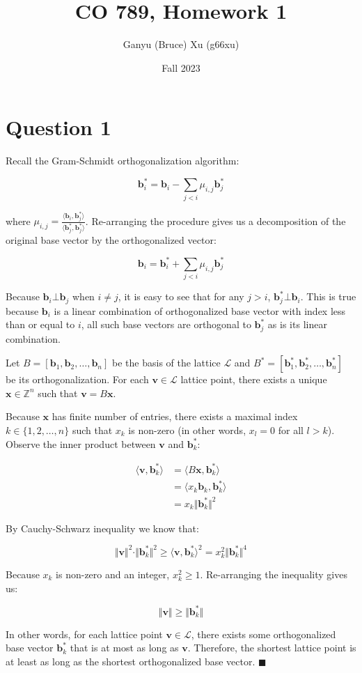 \documentclass{article}
\title{CO 789, Homework 1}
\author{Ganyu (Bruce) Xu (g66xu)}
\date{Fall 2023}
\newcommand{\norm}[1]{\Vert {#1} \Vert}
\begin{document}

\section*{Question 1}
Recall the Gram-Schmidt orthogonalization algorithm:

$$
\mathbf{b}_i^\ast = \mathbf{b}_i - \sum_{j<i} \mu_{i,j} \mathbf{b}_j^\ast
$$

where $\mu_{i, j} = \frac{\langle \mathbf{b}_i, \mathbf{b}_j^\ast \rangle}{\langle \mathbf{b}_j^\ast, \mathbf{b}_j^\ast\rangle}$. Re-arranging the procedure gives us a decomposition of the original base vector by the orthogonalized vector:

$$
\mathbf{b}_i = \mathbf{b}_i^\ast + \sum_{j<i}\mu_{i,j}\mathbf{b}_j^\ast
$$

Because $\mathbf{b}_i \bot \mathbf{b}_j$ when $i \neq j$, it is easy to see that for any $j > i$, $\mathbf{b}_j^\ast \bot \mathbf{b}_i$. This is true because $\mathbf{b}_i$ is a linear combination of orthogonalized base vector with index less than or equal to $i$, all such base vectors are orthogonal to $\mathbf{b}_j^\ast$ as is its linear combination.

Let $B = [\mathbf{b}_1, \mathbf{b}_2, \ldots, \mathbf{b}_n]$ be the basis of the lattice $\mathcal{L}$ and $B^\ast = [\mathbf{b}_1^\ast, \mathbf{b}_2^\ast, \ldots, \mathbf{b}_n^\ast]$ be its orthogonalization. For each $\mathbf{v} \in \mathcal{L}$ lattice point, there exists a unique $\mathbf{x} \in \mathbb{Z}^n$ such that $\mathbf{v} = B\mathbf{x}$.

Because $\mathbf{x}$ has finite number of entries, there exists a maximal index $k \in \{1, 2, \ldots, n\}$ such that $x_k$ is non-zero (in other words, $x_l = 0$ for all $l > k$). Observe the inner product between $\mathbf{v}$ and $\mathbf{b}_k^\ast$:

$$
\begin{aligned}
\langle \mathbf{v}, \mathbf{b}_k^\ast \rangle
&= \langle B\mathbf{x}, \mathbf{b}_k^\ast\rangle \\
&= \langle x_k\mathbf{b}_k, \mathbf{b}_k^\ast \rangle \\
&= x_k \norm{\mathbf{b}_k^\ast}^2
\end{aligned}
$$

By Cauchy-Schwarz inequality we know that:

$$
\norm{\mathbf{v}}^2 \cdot \norm{\mathbf{b}_k^\ast}^2 
\geq \langle \mathbf{v}, \mathbf{b}_k^\ast \rangle^2 
= x_k^2 \norm{\mathbf{b}_k^\ast}^4
$$

Because $x_k$ is non-zero and an integer, $x_k^2 \geq 1$. Re-arranging the inequality gives us:

$$
\norm{\mathbf{v}} \geq \norm{\mathbf{b}_k^\ast}
$$

In other words, for each lattice point $\mathbf{v} \in \mathcal{L}$, there exists some orthogonalized base vector $\mathbf{b}_k^\ast$ that is at most as long as $\mathbf{v}$. Therefore, the shortest lattice point is at least as long as the shortest orthogonalized base vector. $\blacksquare$
\end{document}
